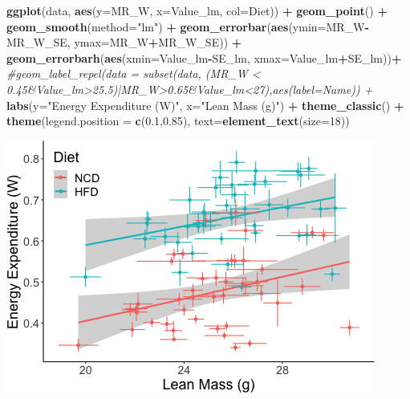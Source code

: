 \documentclass[]{article}
\newenvironment{Shaded}{\begin{snugshade}}{\end{snugshade}}
\newcommand{\CommentTok}[1]{\textcolor[rgb]{0.56,0.35,0.01}{\textit{#1}}}
\newcommand{\DataTypeTok}[1]{\textcolor[rgb]{0.13,0.29,0.53}{#1}}
\newcommand{\DecValTok}[1]{\textcolor[rgb]{0.00,0.00,0.81}{#1}}
\newcommand{\FloatTok}[1]{\textcolor[rgb]{0.00,0.00,0.81}{#1}}
\newcommand{\KeywordTok}[1]{\textcolor[rgb]{0.13,0.29,0.53}{\textbf{#1}}}
\newcommand{\NormalTok}[1]{#1}
\newcommand{\OperatorTok}[1]{\textcolor[rgb]{0.81,0.36,0.00}{\textbf{#1}}}
\newcommand{\StringTok}[1]{\textcolor[rgb]{0.31,0.60,0.02}{#1}}
\begin{document}
\begin{Shaded}
\begin{Highlighting}[]
\KeywordTok{ggplot}\NormalTok{(data, }\KeywordTok{aes}\NormalTok{(}\DataTypeTok{y=}\NormalTok{MR_W,}
           \DataTypeTok{x=}\NormalTok{Value_lm,}
           \DataTypeTok{col=}\NormalTok{Diet)) }\OperatorTok{+}
\StringTok{  }\KeywordTok{geom_point}\NormalTok{() }\OperatorTok{+}
\StringTok{  }\KeywordTok{geom_smooth}\NormalTok{(}\DataTypeTok{method=}\StringTok{"lm"}\NormalTok{) }\OperatorTok{+}
\StringTok{  }\KeywordTok{geom_errorbar}\NormalTok{(}\KeywordTok{aes}\NormalTok{(}\DataTypeTok{ymin=}\NormalTok{MR_W}\OperatorTok{-}\NormalTok{MR_W_SE,}
                \DataTypeTok{ymax=}\NormalTok{MR_W}\OperatorTok{+}\NormalTok{MR_W_SE)) }\OperatorTok{+}
\StringTok{  }\KeywordTok{geom_errorbarh}\NormalTok{(}\KeywordTok{aes}\NormalTok{(}\DataTypeTok{xmin=}\NormalTok{Value_lm}\OperatorTok{-}\NormalTok{SE_lm,}
                \DataTypeTok{xmax=}\NormalTok{Value_lm}\OperatorTok{+}\NormalTok{SE_lm))}\OperatorTok{+}
\StringTok{  }\CommentTok{#geom_label_repel(data = subset(data, (MR_W < 0.45&Value_lm>25.5)|MR_W>0.65&Value_lm<27),aes(label=Name)) +}
\StringTok{  }\KeywordTok{labs}\NormalTok{(}\DataTypeTok{y=}\StringTok{"Energy Expenditure (W)"}\NormalTok{,}
       \DataTypeTok{x=}\StringTok{"Lean Mass (g)"}\NormalTok{) }\OperatorTok{+}
\StringTok{  }\KeywordTok{theme_classic}\NormalTok{() }\OperatorTok{+}
\StringTok{  }\KeywordTok{theme}\NormalTok{(}\DataTypeTok{legend.position =} \KeywordTok{c}\NormalTok{(}\FloatTok{0.1}\NormalTok{,}\FloatTok{0.85}\NormalTok{),}
        \DataTypeTok{text=}\KeywordTok{element_text}\NormalTok{(}\DataTypeTok{size=}\DecValTok{18}\NormalTok{))}
\end{Highlighting}
\end{Shaded}

\includegraphics{figures/lean-mass-adjusting-2.png}
\end{document}
